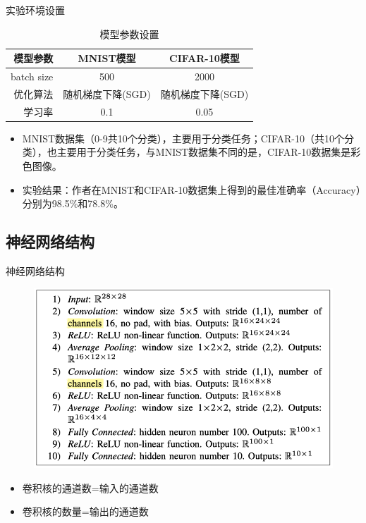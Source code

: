 \documentclass{beamer}
\begin{document}
\begin{frame}{实验环境设置}
\begin{table}[htpb]
            \centering
            \caption{模型参数设置}
            \label{tab:number}
            \begin{tabular}{rcc}\toprule
            	模型参数 & MNIST模型 & CIFAR-10模型 \\\midrule
            	batch size & 500 & 2000 \\
            	优化算法 & 随机梯度下降(SGD) & 随机梯度下降(SGD) \\
            	学习率 & 0.1 & 0.05 \\\bottomrule
            \end{tabular}
\end{table}
\begin{itemize}%
	\item {\footnotesize MNIST数据集（0-9共10个分类），主要用于分类任务；CIFAR-10（共10个分类），也主要用于分类任务，与MNIST数据集不同的是，CIFAR-10数据集是彩色图像。}
	\item {{\footnotesize \color {red}实验结果：作者在MNIST和CIFAR-10数据集上得到的最佳准确率（Accuracy）分别为98.5\%和78.8\%}}。
\end{itemize}  
\end{frame}



\subsection{神经网络结构}
\begin{frame}{神经网络结构}
\begin{figure}[h]
    	\centering
        \includegraphics[height=.7\textheight]{pic/fig4.png}
\end{figure} 
    
\begin{itemize}
\item {\footnotesize 卷积核的通道数=输入的通道数}
\item {\footnotesize 卷积核的数量=输出的通道数}
\end{itemize}
\end{frame}
\end{document}
